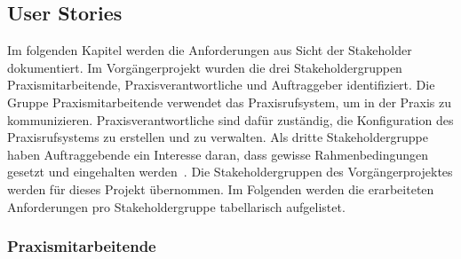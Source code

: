 \subsection{User Stories}

Im folgenden Kapitel werden die Anforderungen aus Sicht der Stakeholder dokumentiert.
Im Vorgängerprojekt wurden die drei Stakeholdergruppen Praxismitarbeitende, Praxisverantwortliche und Auftraggeber identifiziert.
Die Gruppe Praxismitarbeitende verwendet das Praxisrufsystem, um in der Praxis zu kommunizieren.
Praxisverantwortliche sind dafür zuständig, die Konfiguration des Praxisrufsystems zu erstellen und zu verwalten.
Als dritte Stakeholdergruppe haben Auftraggebende ein Interesse daran, dass gewisse Rahmenbedingungen gesetzt und eingehalten werden~\cite{ip5}.
Die Stakeholdergruppen des Vorgängerprojektes werden für dieses Projekt übernommen.
Im Folgenden werden die erarbeiteten Anforderungen pro Stakeholdergruppe tabellarisch aufgelistet.

\subsubsection{Praxismitarbeitende}

